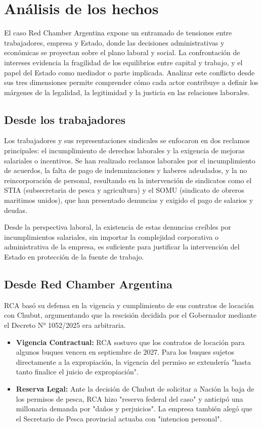 \documentclass[]{informeutn}
\begin{document}
  \chapter{Análisis de los hechos}
    El caso Red Chamber Argentina expone un entramado de tensiones entre trabajadores, empresa y Estado, donde las
    decisiones administrativas y económicas se proyectan sobre el plano laboral y social. La confrontación de intereses
    evidencia la fragilidad de los equilibrios entre capital y trabajo, y el papel del Estado como mediador o parte
    implicada. Analizar este conflicto desde sus tres dimensiones permite comprender cómo cada actor contribuye a
    definir los márgenes de la legalidad, la legitimidad y la justicia en las relaciones laborales.

    \section{Desde los trabajadores}
      Los trabajadores y sus representaciones sindicales se enfocaron en dos reclamos principales: el incumplimiento de
      derechos laborales y la exigencia de mejoras salariales o incentivos. Se han realizado reclamos laborales por el
      incumplimiento de acuerdos, la falta de pago de indemnizaciones y haberes adeudados, y la no reincorporación de
      personal, resultando en la intervención de sindicatos como el STIA (subsecretaria de pesca y agricultura) y el
      SOMU (sindicato de obreros maritimos unidos), que han presentado denuncias y exigido el pago de salarios y deudas.

      Desde la perspectiva laboral, la existencia de estas denuncias creíbles por incumplimientos salariales, sin
      importar la complejidad corporativa o administrativa de la empresa, es suficiente para justificar la intervención
      del Estado en protección de la fuente de trabajo.

    \section{Desde Red Chamber Argentina}
      RCA basó su defensa en la vigencia y cumplimiento de sus contratos de locación con Chubut, argumentando que la
      rescisión decidida por el Gobernador mediante el Decreto N° 1052/2025 era arbitraria.
      \begin{itemize}
        \item \textbf{Vigencia Contractual:} RCA sostuvo que los contratos de locación para algunos buques vencen en
          septiembre de 2027. Para los buques sujetos directamente a la expropiación, la vigencia del permiso se
          extendería "hasta tanto finalice el juicio de expropiación".
        \item \textbf{Reserva Legal:} Ante la decisión de Chubut de solicitar a Nación la baja de los
          permisos de pesca, RCA hizo "reserva federal del caso" y anticipó una millonaria demanda por "daños y
          perjuicios". La empresa también alegó que el Secretario de Pesca provincial actuaba con "intencion personal".
      \end{itemize}
\end{document}
